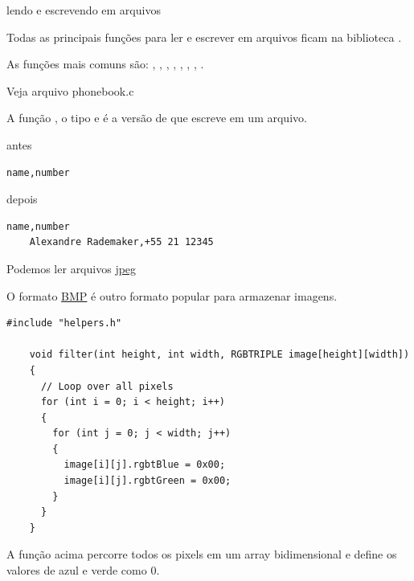 \documentclass{beamer}
\begin{document}
\begin{frame}{lendo e escrevendo em arquivos}

  Todas as principais funções para ler e escrever em arquivos ficam na
  biblioteca .

  As funções mais comuns são: , ,
  , , , ,
  , .

  \framebreak

  Veja arquivo phonebook.c

  A função , o tipo  e  é a
  versão de  que escreve em um arquivo.

  \framebreak

  antes

  \begin{lstlisting}[style=code,caption=phonebook.csv,autogobble]
  name,number
  \end{lstlisting}

  depois

  \begin{lstlisting}[style=code,caption=phonebook.csv,autogobble]
    name,number
    Alexandre Rademaker,+55 21 12345
  \end{lstlisting}

  \framebreak

  Podemos ler arquivos \href{https://www.file-recovery.com/jpg-signature-format.htm}{jpeg}

  

  \framebreak

  O formato \href{https://en.wikipedia.org/wiki/BMP_file_format}{BMP}
  é outro formato popular para armazenar imagens. 

  \begin{lstlisting}[style=tinyc,autogobble,caption=src/filter]
    #include "helpers.h"
  
    void filter(int height, int width, RGBTRIPLE image[height][width])
    {
      // Loop over all pixels
      for (int i = 0; i < height; i++)
      {
        for (int j = 0; j < width; j++)
        {
          image[i][j].rgbtBlue = 0x00;
          image[i][j].rgbtGreen = 0x00;
        }
      }
    }
  \end{lstlisting}

  A função acima percorre todos os pixels em um array bidimensional
  e define os valores de azul e verde como 0.
  
\end{frame}
\end{document}
